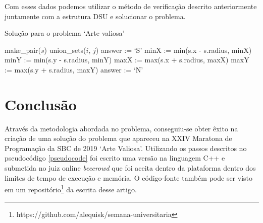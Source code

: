 \documentclass[12pt]{article}
\begin{document}
Com esses dados podemos utilizar o método de verificação descrito anteriormente juntamente com a estrutura DSU e solucionar o problema.

\begin{algorithm}[ht]
    \caption{Solução para o problema `Arte valiosa'}
    \label{pseudocode}
    \begin{algorithmic}[1]
           \STATE make\_pair($s$)
       \ENDFOR
                        \STATE union\_sets($i$, $j$)
                    \ENDIF
                \ENDIF
            \ENDFOR
       \ENDFOR
       \STATE answer := `S'
               \STATE minX := min(s.x - s.radius, minX)
               \STATE minY := min(s.y - s.radius, minY)
               \STATE maxX := max(s.x + s.radius, maxX)
               \STATE maxY := max(s.y + s.radius, maxY)
           \ENDFOR
            \STATE answer := `N'
           \ENDIF
       \ENDFOR
    \end{algorithmic}
\end{algorithm}

\section{Conclusão}
Através da metodologia abordada no problema, conseguiu-se obter êxito na criação de uma solução do problema que apareceu na XXIV Maratona de Programação da SBC de 2019 `Arte Valiosa'. Utilizando os passos descritos no pseudocódigo \ref{pseudocode} foi escrito uma versão na linguagem C++ e submetida no juiz online \textit{beecrowd} que foi aceita dentro da plataforma dentro dos limites de tempo de execução e memória. O código-fonte também pode ser visto em um repositório\footnote{https://github.com/alequisk/semana-universitaria} da escrita desse artigo.



\end{document}
